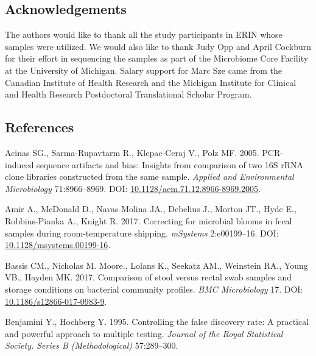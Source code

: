 \documentclass[12pt,]{article}
\begin{document}
\newpage

\subsection{Acknowledgements}\label{acknowledgements}

The authors would like to thank all the study participants in ERIN whose
samples were utilized. We would also like to thank Judy Opp and April
Cockburn for their effort in sequencing the samples as part of the
Microbiome Core Facility at the University of Michigan. Salary support
for Marc Sze came from the Canadian Institute of Health Research and the
Michigan Institute for Clinical and Health Research Postdoctoral
Translational Scholar Program.

\newpage

\subsection{References}\label{references}

\hypertarget{refs}{}
\hypertarget{ref-Acinas2005}{}
Acinas SG., Sarma-Rupavtarm R., Klepac-Ceraj V., Polz MF. 2005.
PCR-induced sequence artifacts and bias: Insights from comparison of two
16S rRNA clone libraries constructed from the same sample. \emph{Applied
and Environmental Microbiology} 71:8966--8969. DOI:
\href{https://doi.org/10.1128/aem.71.12.8966-8969.2005}{10.1128/aem.71.12.8966-8969.2005}.

\hypertarget{ref-Amir2017}{}
Amir A., McDonald D., Navas-Molina JA., Debelius J., Morton JT., Hyde
E., Robbins-Pianka A., Knight R. 2017. Correcting for microbial blooms
in fecal samples during room-temperature shipping. \emph{mSystems}
2:e00199--16. DOI:
\href{https://doi.org/10.1128/msystems.00199-16}{10.1128/msystems.00199-16}.

\hypertarget{ref-storage_Bassis_2017}{}
Bassis CM., Nicholas M. Moore., Lolans K., Seekatz AM., Weinstein RA.,
Young VB., Hayden MK. 2017. Comparison of stool versus rectal swab
samples and storage conditions on bacterial community profiles.
\emph{BMC Microbiology} 17. DOI:
\href{https://doi.org/10.1186/s12866-017-0983-9}{10.1186/s12866-017-0983-9}.

\hypertarget{ref-benjamini_controlling_1995}{}
Benjamini Y., Hochberg Y. 1995. Controlling the false discovery rate: A
practical and powerful approach to multiple testing. \emph{Journal of
the Royal Statistical Society. Series B (Methodological)} 57:289--300.
\end{document}
